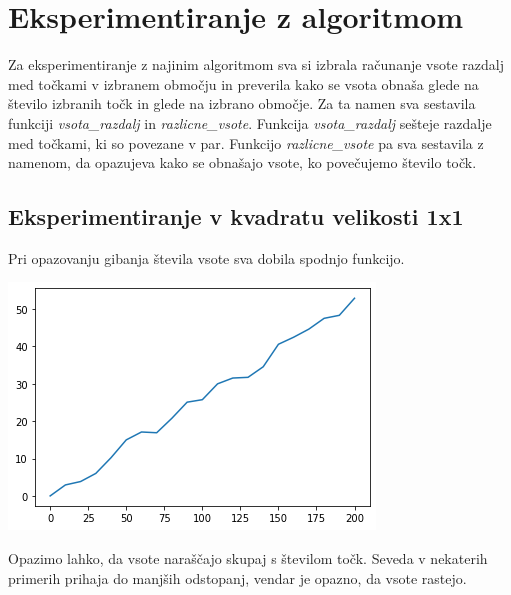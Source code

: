 \documentclass[12pt, a4paper]{article}
\begin{document}
\pagebreak
\section{Eksperimentiranje z algoritmom}
Za eksperimentiranje z najinim algoritmom sva si izbrala računanje vsote razdalj med točkami v izbranem območju in preverila kako se vsota obnaša glede na število izbranih točk in glede na izbrano območje. Za ta namen sva sestavila funkciji \textit{vsota_razdalj} in \textit{razlicne_vsote}. Funkcija  \textit{vsota_razdalj} sešteje razdalje med točkami, ki so povezane v par. Funkcijo \textit{razlicne_vsote} pa sva sestavila z namenom, da opazujeva kako se obnašajo vsote, ko povečujemo število točk. \\

\subsection{Eksperimentiranje v kvadratu velikosti 1x1}
Pri opazovanju gibanja števila vsote sva dobila spodnjo funkcijo.\\
\begin{center}
\includegraphics{kvadrat_1x1.png}
\end{center}
Opazimo lahko, da vsote naraščajo skupaj s številom točk. Seveda v nekaterih primerih prihaja do manjših odstopanj, vendar je opazno, da vsote rastejo.
\end{document}
